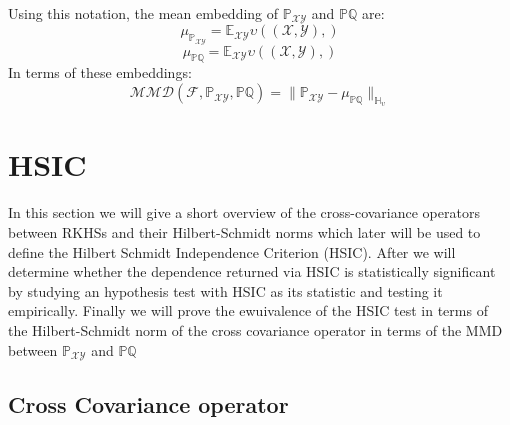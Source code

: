 \documentclass[8pt,a4paper]{article}
\theoremstyle{plain}
\theoremstyle{definition}
\theoremstyle{remark}
\providecommand{\norm}[1]{\lVert#1\rVert}
\begin{document}
Using this notation, the mean embedding of $\mathbb{P}_{\mathcal{X}\mathcal{Y}}$ and $\mathbb{P}\mathbb{Q}$ are:
$$\mu_{\mathbb{P}_{\mathcal{X}\mathcal{Y}}} = \mathbb{E}_{\mathcal{X}\mathcal{Y}}\upsilon((\mathcal{X},\mathcal{Y}),)$$
$$\mu_{\mathbb{P}\mathbb{Q}} = \mathbb{E}_{\mathcal{X}\mathcal{Y}}\upsilon((\mathcal{X},\mathcal{Y}),)$$
In terms of these embeddings:
$$\mathcal{MMD}(\mathcal{F}, \mathbb{P}_{\mathcal{XY}},\mathbb{P}\mathbb{Q}) = \norm{\mathbb{P}_{\mathcal{X}\mathcal{Y}}-\mu_{\mathbb{P}\mathbb{Q}} }_{\mathbb{H}_{\upsilon}}$$

\section{HSIC}

In this section we will give a short overview of the cross-covariance operators between RKHSs and their Hilbert-Schmidt norms which later will be used to define the Hilbert Schmidt Independence Criterion (HSIC).
After we will determine whether the dependence returned via HSIC is statistically significant by studying an hypothesis test with HSIC as its statistic and testing it empirically.
Finally we will prove the ewuivalence of the HSIC test in terms of the Hilbert-Schmidt norm of the cross covariance operator in terms of the MMD between $\mathbb{P}_{\mathcal{X}\mathcal{Y}}$ and $\mathbb{P}\mathbb{Q}$

\subsection{Cross Covariance operator}
\end{document}

